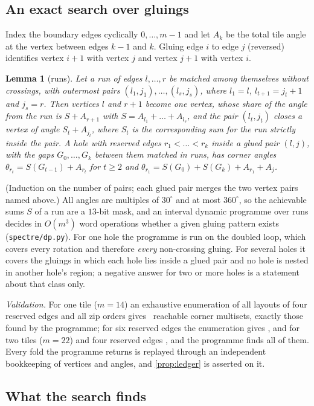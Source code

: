 \documentclass[11pt]{article}
\newtheorem{lemma}[theorem]{Lemma}
\theoremstyle{definition}
\theoremstyle{remark}
\begin{document}
\subsection{An exact search over gluings}
Index the boundary edges cyclically $0,\dots,m-1$ and let $A_k$ be the total tile angle at the vertex between edges $k-1$ and $k$. Gluing edge $i$ to edge $j$ (reversed) identifies vertex $i+1$ with vertex $j$ and vertex $j+1$ with vertex $i$.
\begin{lemma}[runs]\label{lem:runs}
Let a run of edges $l,\dots,r$ be matched among themselves without crossings, with outermost pairs $(l_1,j_1),\dots,(l_s,j_s)$, where $l_1=l$, $l_{t+1}=j_t+1$ and $j_s=r$. Then vertices $l$ and $r+1$ become one vertex, whose share of the angle from the run is
$S+A_{r+1}$ with $S=A_{l_1}+\dots+A_{l_s}$, and the pair $(l_t,j_t)$ closes a vertex of angle $S_t+A_{j_t}$, where $S_t$ is the corresponding sum for the run strictly inside the pair.
A hole with reserved edges $r_1<\dots<r_k$ inside a glued pair $(l,j)$, with the gaps $G_0,\dots,G_k$ between them matched in runs, has corner angles
$\theta_{r_t}=S(G_{t-1})+A_{r_t}$ for $t\ge2$ and $\theta_{r_1}=S(G_0)+S(G_k)+A_{r_1}+A_j$.
\end{lemma}
\noindent(Induction on the number of pairs; each glued pair merges the two vertex pairs named above.) All angles are multiples of $30^\circ$ and at most $360^\circ$, so the achievable sums $S$ of a run are a $13$-bit mask, and an interval dynamic programme over runs
decides in $O(m^3)$ word operations whether a given gluing pattern exists (\texttt{spectre/dp.py}). For one hole the programme is run on the doubled loop, which covers every rotation and therefore \emph{every} non-crossing gluing. For several holes it covers the gluings in which each hole lies inside a glued pair and no hole is nested in another hole's region; a negative answer for two or more holes is a statement about that class only.

\emph{Validation.} For one tile ($m=14$) an exhaustive enumeration of all layouts of four reserved edges and all zip orders gives \spBruteOne\ reachable corner multisets, exactly those found by the programme; for six reserved edges the enumeration gives \spBruteSix, and for two tiles ($m=22$) and four reserved edges \spBruteTwo, and the programme finds all of them. Every fold the programme returns is replayed through an independent bookkeeping of vertices and angles, and \cref{prop:ledger} is asserted on it.

\subsection{What the search finds}
\end{document}
